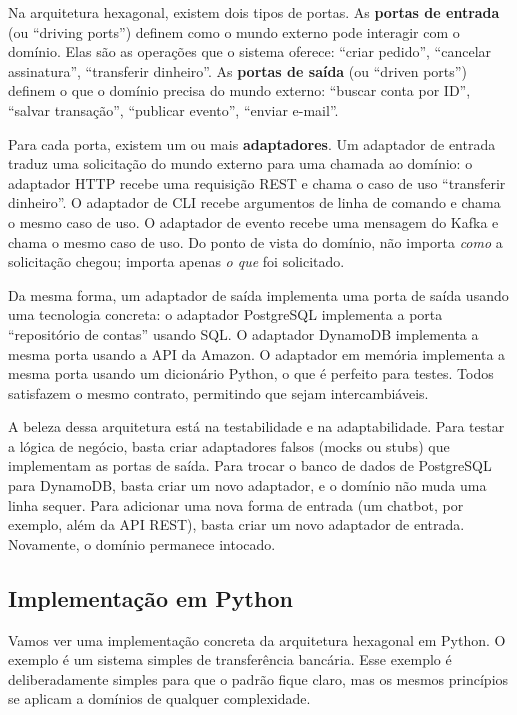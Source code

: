 Na arquitetura hexagonal, existem dois tipos de portas. As \textbf{portas de
entrada} (ou ``driving ports'') definem como o mundo externo pode interagir
com o domínio. Elas são as operações que o sistema oferece: ``criar pedido'',
``cancelar assinatura'', ``transferir dinheiro''. As \textbf{portas de saída}
(ou ``driven ports'') definem o que o domínio precisa do mundo externo:
``buscar conta por ID'', ``salvar transação'', ``publicar evento'',
``enviar e-mail''.

Para cada porta, existem um ou mais \textbf{adaptadores}. Um adaptador de
entrada traduz uma solicitação do mundo externo para uma chamada ao domínio:
o adaptador HTTP recebe uma requisição REST e chama o caso de uso ``transferir
dinheiro''. O adaptador de CLI recebe argumentos de linha de comando e chama o
mesmo caso de uso. O adaptador de evento recebe uma mensagem do Kafka e chama
o mesmo caso de uso. Do ponto de vista do domínio, não importa \textit{como} a
solicitação chegou; importa apenas \textit{o que} foi solicitado.

Da mesma forma, um adaptador de saída implementa uma porta de saída usando
uma tecnologia concreta: o adaptador PostgreSQL implementa a porta
``repositório de contas'' usando SQL. O adaptador DynamoDB implementa a
mesma porta usando a API da Amazon. O adaptador em memória implementa a
mesma porta usando um dicionário Python, o que é perfeito para testes. Todos
satisfazem o mesmo contrato, permitindo que sejam intercambiáveis.

A beleza dessa arquitetura está na testabilidade e na adaptabilidade. Para testar
a lógica de negócio, basta criar adaptadores falsos (mocks ou stubs) que
implementam as portas de saída. Para trocar o banco de dados de PostgreSQL para
DynamoDB, basta criar um novo adaptador, e o domínio não muda uma linha sequer.
Para adicionar uma nova forma de entrada (um chatbot, por exemplo, além da API
REST), basta criar um novo adaptador de entrada. Novamente, o domínio
permanece intocado.

\subsection{Implementação em Python}

Vamos ver uma implementação concreta da arquitetura hexagonal em Python. O
exemplo é um sistema simples de transferência bancária. Esse exemplo é
deliberadamente simples para que o padrão fique claro, mas os mesmos princípios
se aplicam a domínios de qualquer complexidade.

